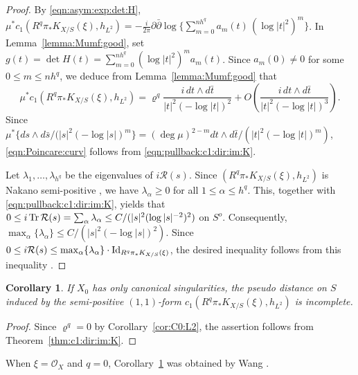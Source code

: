 \documentclass[amscd, leqno]{amsart}
\theoremstyle{plain}
\newtheorem{corollary}[theorem]{Corollary}
\theoremstyle{definition}
\theoremstyle{remark}
\newenvironment{pf}{\begin{proof}}{\end{proof}}
\begin{document}
\begin{pf} 
By \eqref{eqn:asym:exp:det:H}, 
$\mu^{*}c_{1}(R^{q}\pi_{*}K_{X/S}(\xi),h_{L^{2}}) = -\frac{i}{2\pi}\partial\bar{\partial} \log \{ \sum_{m=0}^{nh^{q}}a_{m}(t)\,(\log |t|^{2})^{m} \}$.
In Lemma~\ref{lemma:Mumf:good}, set $g(t) = \det H(t) = \sum_{m=0}^{nh^{q}} (\log |t|^{2})^{m} a_{m}(t)$.
Since $a_{m}(0)\not=0$ for some $0\leq m \leq nh^{q}$, we deduce from Lemma~\ref{lemma:Mumf:good} that
\begin{equation}
\label{eqn:pullback:c1:dir:im:K}
\mu^{*}c_{1}(R^{q}\pi_{*}K_{X/S}(\xi),h_{L^{2}}) 
= \varrho^{q}\frac{i\,dt\wedge d\bar{t}}{|t|^{2}(-\log|t|)^{2}} + O\left(\frac{i\,dt\wedge d\bar{t}}{|t|^{2}(-\log|t|)^{3}}\right).
\end{equation}
Since $\mu^{*}\{ds\wedge d\bar{s}/(|s|^{2}(-\log |s|)^{m}\} = (\deg \mu)^{2-m} dt\wedge d\bar{t}/(|t|^{2} (-\log |t|)^{m})$, 
\eqref{eqn:Poincare:curv} follows from \eqref{eqn:pullback:c1:dir:im:K}.
\par
Let $\lambda_{1},\ldots,\lambda_{h^{q}}$ be the eigenvalues of $i{\mathcal R}(s)$. 
Since $(R^{q}\pi_{*}K_{X/S}(\xi),h_{L^{2}})$ is Nakano semi-positive \cite{Berndtsson09, MourouganeTakayama08}, 
we have $\lambda_{\alpha} \geq 0$ for all $1 \leq \alpha \leq h^{q}$. This, together with \eqref{eqn:pullback:c1:dir:im:K}, yields that
$0 \leq i\,{\rm Tr}\,{\mathcal R}(s) = \sum_{\alpha}\lambda_{\alpha} \leq C/(|s|^{2}(\log |s|^{-2})^{2})$ on $S^{o}$.
Consequently, $\max_{\alpha}\{\lambda_{\alpha}\} \leq C/(|s|^{2}(-\log|s|)^{2})$. 
Since $0 \leq i{\mathcal R}(s) \leq \max_{\alpha}\{\lambda_{\alpha}\}\cdot{\rm Id}_{R^{q}\pi_{*}K_{X/S}(\xi)}$,
the desired inequality follows from this inequality . 
\end{pf}


\begin{corollary}
\label{cor:Wang}
If $X_{0}$ has only canonical singularities, 
the pseudo distance on $S$ induced by the semi-positive $(1,1)$-form $c_{1}(R^{q}\pi_{*}K_{X/S}(\xi), h_{L^{2}})$ is incomplete.
\end{corollary}

\begin{pf}
Since $\varrho^{q}=0$ by Corollary~\ref{cor:C0:L2}, the assertion follows from Theorem~\ref{thm:c1:dir:im:K}.
\end{pf}


When $\xi = {\mathcal O}_{X}$ and $q=0$, Corollary~\ref{cor:Wang} was obtained by Wang \cite[Th.\,1.1]{Wang03}.
\end{document}

